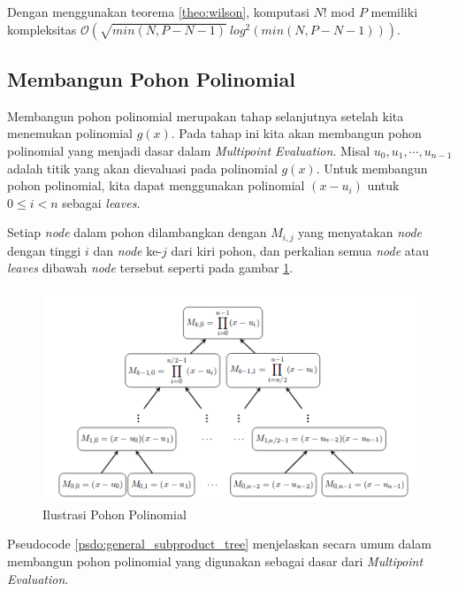 Dengan menggunakan teorema \ref{theo:wilson}, komputasi $ N! $  mod $ P $ memiliki kompleksitas $ \mathcal{O}{(\sqrt{min(N,P-N-1)}\ log^2 (min(N,P-N-1)) )}$.

\subsection{Membangun Pohon Polinomial}
\label{sec:membangun_pohon_polinomial}
Membangun pohon polinomial merupakan tahap selanjutnya setelah kita menemukan polinomial $ g(x) $. Pada tahap ini kita akan membangun pohon polinomial yang menjadi dasar dalam \textit{Multipoint Evaluation}. Misal $ u_0, u_1, \cdots , u_{n-1} $ adalah titik yang akan dievaluasi pada polinomial $ g(x) $. Untuk membangun pohon polinomial, kita dapat menggunakan polinomial $( x - u_i) $ untuk $ 0 \leq i < n $ sebagai \textit{leaves}.

Setiap \textit{node} dalam pohon dilambangkan dengan $ M_{i,j} $ yang menyatakan \textit{node} dengan tinggi $ i $ dan \textit{node} ke-$j$ dari kiri pohon, dan perkalian semua \textit{node} atau \textit{leaves} dibawah \textit{node} tersebut seperti pada gambar \ref{fig:ilustrasi-pohon-polinomial}. 

\begin{figure}
	\Centering
	\includegraphics [scale=0.5]{bab2/img/ilustrasi-pohon-polinomial}
	\caption {Ilustrasi Pohon Polinomial}
	\label {fig:ilustrasi-pohon-polinomial}
\end{figure}

Pseudocode \ref{psdo:general_subproduct_tree} menjelaskan secara umum dalam membangun pohon polinomial yang digunakan sebagai dasar dari \textit{Multipoint Evaluation}.

